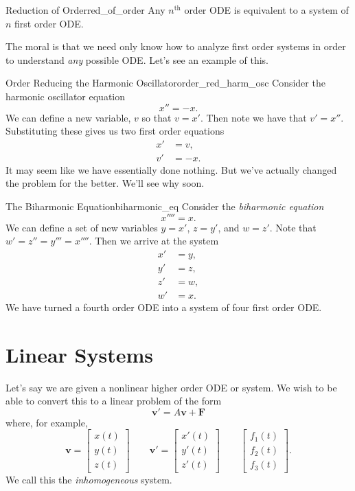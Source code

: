         \begin{thm}{Reduction of Order}{red_of_order}
        Any $n ^\textrm{th}$ order ODE is equivalent to a system of $n$ first order ODE.  
        \end{thm}
        
        The moral is that we need only know how to analyze first order systems in order to understand \emph{any} possible ODE.  Let's see an example of this.
        
        \begin{ex}{Order Reducing the Harmonic Oscillator}{order_red_harm_osc}
        Consider the harmonic oscillator equation
        \[
        x''=-x.
        \]
        We can define a new variable, $v$ so that $v=x'$.  Then note we have that $v'=x''$.  Substituting these gives us two first order equations
        \begin{align*}
            x'&=v,\\
            v'&=-x.
        \end{align*}
        It may seem like we have essentially done nothing.  But we've actually changed the problem for the better.  We'll see why soon.
        \end{ex}
        
        \begin{ex}{The Biharmonic Equation}{biharmonic_eq}
        Consider the \emph{biharmonic equation}
        \[
        x''''=x.
        \]
        We can define a set of new variables $y=x'$, $z=y'$, and $w=z'$.  Note that $w'=z''=y'''=x''''$. Then we arrive at the system
        \begin{align*}
            x'&=y,\\
            y'&=z,\\
            z'&=w,\\
            w'&=x.
        \end{align*}
        We have turned a fourth order ODE into a system of four first order ODE.
        \end{ex}
        
        \section{Linear Systems}
        Let's say we are given a nonlinear higher order ODE or system. We wish to be able to convert this to a linear problem of the form 
        \[
        \mathbf{v}'=A\mathbf{v}+\mathbf{F}
        \]
        where, for example, 
        \[
        \mathbf{v}=\begin{bmatrix} x(t) \\ y(t) \\ z(t) \end{bmatrix} \qquad \mathbf{v}'=\begin{bmatrix} x'(t) \\ y'(t) \\ z'(t) \end{bmatrix} \qquad \begin{bmatrix} f_1(t) \\ f_2(t) \\ f_3(t) \end{bmatrix}.
        \]
        We call this the \emph{inhomogeneous} system. 
        
